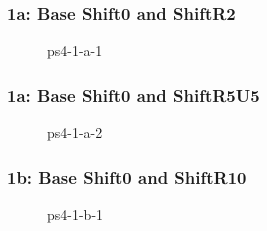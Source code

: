 \documentclass[../report.tex]{subfiles}
\begin{document}
    \begin{frame}
        \frametitle{1a: Base Shift0 and ShiftR2}
        \begin{figure}[!htb]
            \centering
            \caption{ps4-1-a-1} 
        \end{figure}
    \end{frame}

    \begin{frame}
        \frametitle{1a: Base Shift0 and ShiftR5U5}
        \begin{figure}[!htb]
            \centering
            \caption{ps4-1-a-2} 
        \end{figure}
    \end{frame}

    \begin{frame}
        \frametitle{1b: Base Shift0 and ShiftR10}
        \begin{figure}[!htb]
            \centering
            \caption{ps4-1-b-1}
        \end{figure}
    \end{frame}
\end{document}
